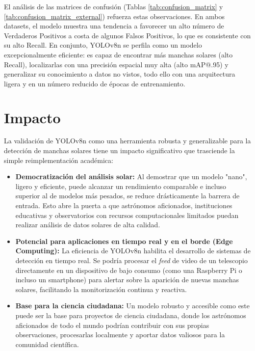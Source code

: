 \documentclass[journal]{IEEEtran}
\begin{document}
El análisis de las matrices de confusión (Tablas \ref{tab:confusion_matrix} y \ref{tab:confusion_matrix_external}) refuerza estas observaciones. En ambos datasets, el modelo muestra una tendencia a favorecer un alto número de Verdaderos Positivos a costa de algunos Falsos Positivos, lo que es consistente con su alto Recall. En conjunto, YOLOv8n se perfila como un modelo excepcionalmente eficiente: es capaz de encontrar más manchas solares (alto Recall), localizarlas con una precisión espacial muy alta (alto mAP@.95) y generalizar su conocimiento a datos no vistos, todo ello con una arquitectura ligera y en un número reducido de épocas de entrenamiento.

\section{Impacto}
La validación de YOLOv8n como una herramienta robusta y generalizable para la detección de manchas solares tiene un impacto significativo que trasciende la simple reimplementación académica:
\begin{itemize}
    \item \textbf{Democratización del análisis solar:} Al demostrar que un modelo "nano", ligero y eficiente, puede alcanzar un rendimiento comparable e incluso superior al de modelos más pesados, se reduce drásticamente la barrera de entrada. Esto abre la puerta a que astrónomos aficionados, instituciones educativas y observatorios con recursos computacionales limitados puedan realizar análisis de datos solares de alta calidad.
    
    \item \textbf{Potencial para aplicaciones en tiempo real y en el borde (Edge Computing):} La eficiencia de YOLOv8n habilita el desarrollo de sistemas de detección en tiempo real. Se podría procesar el \textit{feed} de video de un telescopio directamente en un dispositivo de bajo consumo (como una Raspberry Pi o incluso un smartphone) para alertar sobre la aparición de nuevas manchas solares, facilitando la monitorización continua y reactiva.
    
    \item \textbf{Base para la ciencia ciudadana:} Un modelo robusto y accesible como este puede ser la base para proyectos de ciencia ciudadana, donde los astrónomos aficionados de todo el mundo podrían contribuir con sus propias observaciones, procesarlas localmente y aportar datos valiosos para la comunidad científica.
\end{itemize}
\end{document}
